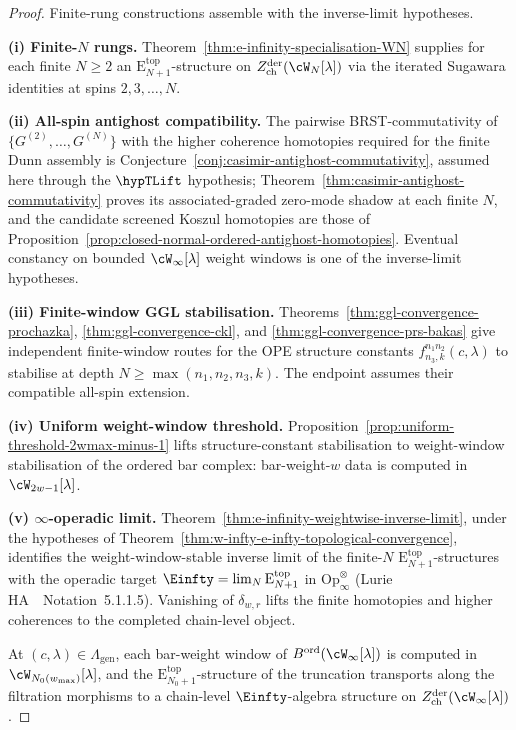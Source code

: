 \begin{proof}
Finite-rung constructions assemble with the inverse-limit
hypotheses.

\textbf{(i) Finite-$N$ rungs.}
Theorem~\ref{thm:e-infinity-specialisation-WN} supplies for each
finite $N \ge 2$ an $\mathrm{E}_{N+1}^{\mathrm{top}}$-structure on
$Z^{\mathrm{der}}_{\mathrm{ch}}(\cW_N[\lambda])$ via the iterated
Sugawara identities at spins $2, 3, \ldots, N$.

\textbf{(ii) All-spin antighost compatibility.}
The pairwise BRST-commutativity of
\(\{G^{(2)},\ldots,G^{(N)}\}\) with the higher coherence homotopies
required for the finite Dunn assembly is
Conjecture~\ref{conj:casimir-antighost-commutativity}, assumed here
through the \(\hypTLift\) hypothesis;
Theorem~\ref{thm:casimir-antighost-commutativity} proves its
associated-graded zero-mode shadow at each finite \(N\), and the
candidate screened Koszul homotopies are those of
Proposition~\ref{prop:closed-normal-ordered-antighost-homotopies}.
Eventual constancy on bounded \(\cW_\infty[\lambda]\) weight
windows is one of the inverse-limit hypotheses.

\textbf{(iii) Finite-window GGL stabilisation.}
Theorems~\ref{thm:ggl-convergence-prochazka},
\ref{thm:ggl-convergence-ckl}, and
\ref{thm:ggl-convergence-prs-bakas} give independent finite-window
routes for the OPE structure constants
$f^{n_1 n_2}_{n_3, k}(c, \lambda)$ to stabilise at depth
$N \ge \max(n_1, n_2, n_3, k)$. The endpoint assumes their
compatible all-spin extension.

\textbf{(iv) Uniform weight-window threshold.}
Proposition~\ref{prop:uniform-threshold-2wmax-minus-1} lifts
structure-constant stabilisation to weight-window stabilisation
of the ordered bar complex: bar-weight-$w$ data is computed in
$\cW_{2w - 1}[\lambda]$.

\textbf{(v) $\infty$-operadic limit.}
Theorem~\ref{thm:e-infinity-weightwise-inverse-limit}, under the
hypotheses of
Theorem~\ref{thm:w-infty-e-infty-topological-convergence},
identifies the weight-window-stable inverse limit of the
finite-$N$ $\mathrm{E}_{N+1}^{\mathrm{top}}$-structures with the
operadic target
$\Einfty = \lim_N \mathrm{E}_{N+1}^{\mathrm{top}}$ in
$\mathrm{Op}_\infty^{\otimes}$
(Lurie HA~\cite{HA}~Notation~5.1.1.5). Vanishing of
\(\delta_{w,r}\) lifts the finite homotopies and higher
coherences to the completed chain-level object.

At $(c, \lambda) \in \Lambda_{\mathrm{gen}}$, each bar-weight
window of $B^{\mathrm{ord}}(\cW_\infty[\lambda])$ is computed in
$\cW_{N_0(w_{\max})}[\lambda]$, and the
$\mathrm{E}_{N_0 + 1}^{\mathrm{top}}$-structure of the truncation
transports along the filtration morphisms to a chain-level
$\Einfty$-algebra structure on
$Z^{\mathrm{der}}_{\mathrm{ch}}(\cW_\infty[\lambda])$.
\end{proof}

